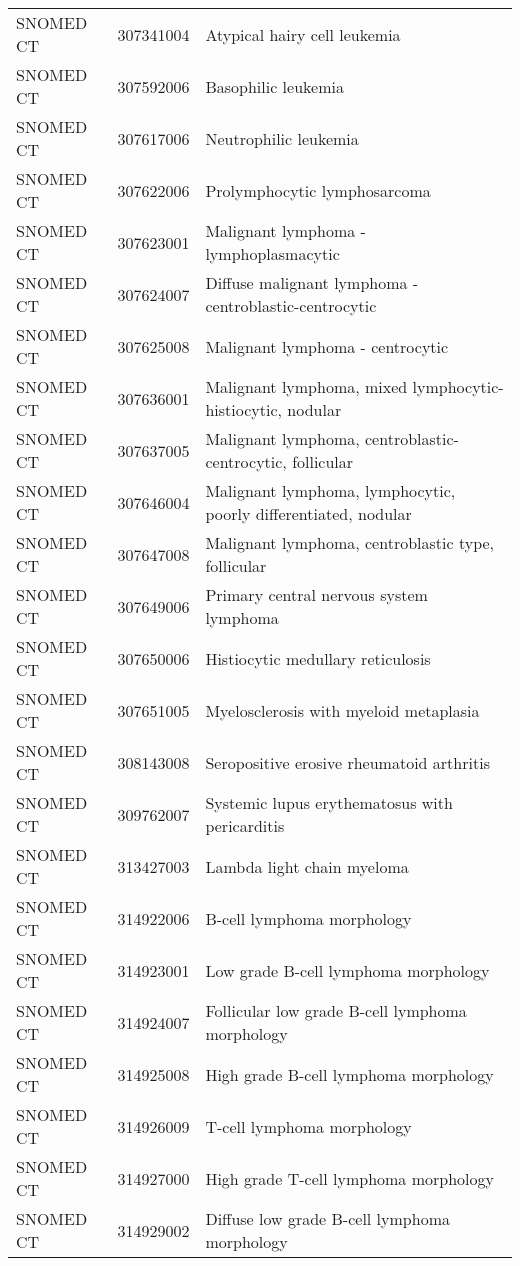 \begin{longtable}{p{}p{}p{}}
  SNOMED CT & 307341004 & Atypical hairy cell leukemia \\ 
  SNOMED CT & 307592006 & Basophilic leukemia \\ 
  SNOMED CT & 307617006 & Neutrophilic leukemia \\ 
  SNOMED CT & 307622006 & Prolymphocytic lymphosarcoma \\ 
  SNOMED CT & 307623001 & Malignant lymphoma - lymphoplasmacytic \\ 
  SNOMED CT & 307624007 & Diffuse malignant lymphoma - centroblastic-centrocytic \\ 
  SNOMED CT & 307625008 & Malignant lymphoma - centrocytic \\ 
  SNOMED CT & 307636001 & Malignant lymphoma, mixed lymphocytic-histiocytic, nodular \\ 
  SNOMED CT & 307637005 & Malignant lymphoma, centroblastic-centrocytic, follicular \\ 
  SNOMED CT & 307646004 & Malignant lymphoma, lymphocytic, poorly differentiated, nodular \\ 
  SNOMED CT & 307647008 & Malignant lymphoma, centroblastic type, follicular \\ 
  SNOMED CT & 307649006 & Primary central nervous system lymphoma \\ 
  SNOMED CT & 307650006 & Histiocytic medullary reticulosis \\ 
  SNOMED CT & 307651005 & Myelosclerosis with myeloid metaplasia \\ 
  SNOMED CT & 308143008 & Seropositive erosive rheumatoid arthritis \\ 
  SNOMED CT & 309762007 & Systemic lupus erythematosus with pericarditis \\ 
  SNOMED CT & 313427003 & Lambda light chain myeloma \\ 
  SNOMED CT & 314922006 & B-cell lymphoma morphology \\ 
  SNOMED CT & 314923001 & Low grade B-cell lymphoma morphology \\ 
  SNOMED CT & 314924007 & Follicular low grade B-cell lymphoma morphology \\ 
  SNOMED CT & 314925008 & High grade B-cell lymphoma morphology \\ 
  SNOMED CT & 314926009 & T-cell lymphoma morphology \\ 
  SNOMED CT & 314927000 & High grade T-cell lymphoma morphology \\ 
  SNOMED CT & 314929002 & Diffuse low grade B-cell lymphoma morphology \\ 

\end{longtable}
